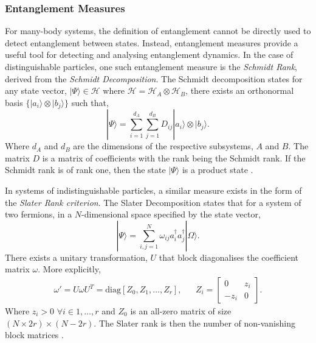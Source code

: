 \subsubsection{Entanglement Measures}

For many-body systems, the definition of entanglement cannot be directly used to detect entanglement between states. Instead, entanglement measures provide a useful tool for detecting and analysing entanglement dynamics. In the case of distinguishable particles, one such entanglement measure is the \textit{Schmidt Rank}, derived from the \textit{Schmidt Decomposition}. The Schmidt decomposition states for any state vector, $|\Psi\rangle \in \mathcal{H}$ where $\mathcal{H} = \mathcal{H}_{A} \otimes \mathcal{H}_{B}$, there exists an orthonormal basis $\{|a_i\rangle \otimes |b_j\rangle\}$ such that,
\begin{equation}\label{Schmidt}
    |\Psi\rangle = \sum_{i = 1}^{d_A} \sum_{j = 1}^{d_B} D_{ij} |a_i\rangle \otimes |b_j\rangle.
\end{equation}
Where $d_A$ and $d_B$ are the dimensions of the respective subsystems, $A$ and $B$. The matrix $D$ is a matrix of coefficients with the rank being the Schmidt rank. If the Schmidt rank is of rank one, then the state $|\Psi\rangle$ is a product state \cite{Horodecki_2009}. 

In systems of indistinguishable particles, a similar measure exists in the form of the \textit{Slater Rank criterion}. The Slater Decomposition states that for a system of two fermions, in a $N$-dimensional  space specified by the state vector,
\begin{equation}\label{Slater}
    |\Psi\rangle = \sum_{i, j = 1}^N \omega_{ij} a^{\dagger}_{i}a^{\dagger}_j|\Omega\rangle.
\end{equation}
There exists a unitary transformation, $U$ that block diagonalises the coefficient matrix $\omega$. More explicitly,
\begin{align*}
    \omega' = U\omega U^{T} = \text{diag}[Z_0, Z_1, \dots, Z_r], && Z_i = 
    \begin{bmatrix}
        0 & z_i \\
        -z_i & 0
    \end{bmatrix}.
\end{align*}
Where $z_i >0$ $ \forall i \in 1, \dots, r$ and $Z_0$ is an all-zero matrix of size $(N \times 2r) \times (N - 2r)$. The Slater rank is then the number of non-vanishing block matrices \cite{Schliemann_2001}.

